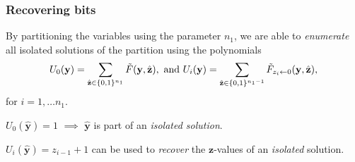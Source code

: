 \documentclass{beamer}
\begin{document}
\begin{frame}
    \frametitle{Recovering bits}
        By partitioning the variables using the parameter $n_1$, we are able to \textit{enumerate} all isolated solutions of the partition using the polynomials
        $$
            U_0(\mathbf{y}) = \sum_{\hat{\mathbf{z}} \in \{0,1\}^{n_1}} \Tilde{F}(\mathbf{y},\hat{\mathbf{z}}), \text{ and } U_i(\mathbf{y}) = \sum_{\hat{\mathbf{z}}\in \{0,1\}^{n_1 - 1}} \Tilde{F}_{z_i \leftarrow 0}(\mathbf{y}, \hat{\mathbf{z}}),
        $$
        for $i = 1, \dots n_1$. \pause

        $U_0(\hat{\mathbf{y}}) = 1$ $\implies$ $\hat{\mathbf{y}}$ is part of an \textit{isolated solution}.

        \pause 

        $U_i(\hat{\mathbf{y}}) = z_{i - 1} + 1$ can be used to \textit{recover} the $\mathbf{z}$-values of an \textit{isolated} solution.
\end{frame}
\end{document}
